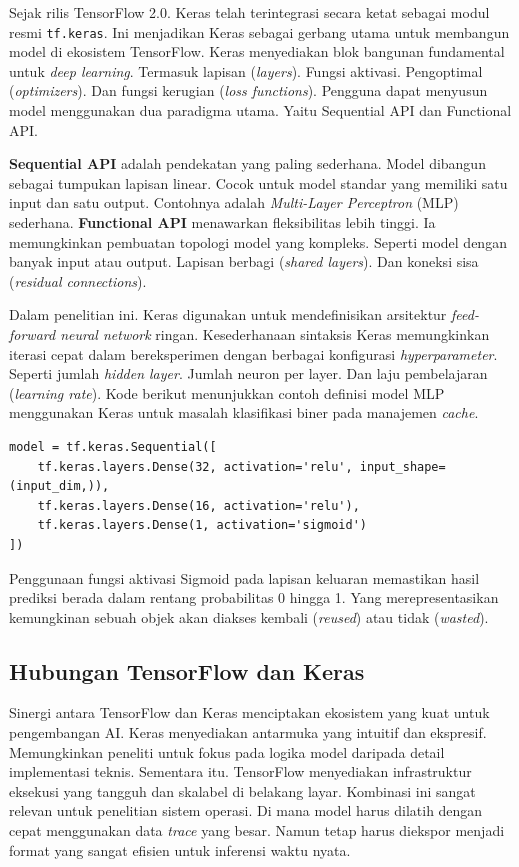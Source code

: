 Sejak rilis TensorFlow 2.0.
Keras telah terintegrasi secara ketat sebagai modul resmi \texttt{tf.keras}.
Ini menjadikan Keras sebagai gerbang utama untuk membangun model di
ekosistem TensorFlow.
Keras menyediakan blok bangunan fundamental untuk \textit{deep learning}.
Termasuk lapisan (\textit{layers}).
Fungsi aktivasi.
Pengoptimal (\textit{optimizers}).
Dan fungsi kerugian (\textit{loss functions}).
Pengguna dapat menyusun model menggunakan dua paradigma utama.
Yaitu Sequential API dan Functional API.

\textbf{Sequential API} adalah pendekatan yang paling sederhana.
Model dibangun sebagai tumpukan lapisan linear.
Cocok untuk model standar yang memiliki satu input dan satu output.
Contohnya adalah \textit{Multi-Layer Perceptron} (MLP) sederhana.
\textbf{Functional API} menawarkan fleksibilitas lebih tinggi.
Ia memungkinkan pembuatan topologi model yang kompleks.
Seperti model dengan banyak input atau output.
Lapisan berbagi (\textit{shared layers}).
Dan koneksi sisa (\textit{residual connections}).

Dalam penelitian ini.
Keras digunakan untuk mendefinisikan arsitektur \textit{feed-forward
neural network} ringan.
Kesederhanaan sintaksis Keras memungkinkan iterasi cepat dalam
bereksperimen dengan berbagai konfigurasi \textit{hyperparameter}.
Seperti jumlah \textit{hidden layer}.
Jumlah neuron per layer.
Dan laju pembelajaran (\textit{learning rate}).
Kode berikut menunjukkan contoh definisi model MLP menggunakan Keras
untuk masalah klasifikasi biner pada manajemen \textit{cache}.

\begin{verbatim}
model = tf.keras.Sequential([
    tf.keras.layers.Dense(32, activation='relu', input_shape=(input_dim,)),
    tf.keras.layers.Dense(16, activation='relu'),
    tf.keras.layers.Dense(1, activation='sigmoid')
])
\end{verbatim}

Penggunaan fungsi aktivasi Sigmoid pada lapisan keluaran memastikan
hasil prediksi berada dalam rentang probabilitas 0 hingga 1.
Yang merepresentasikan kemungkinan sebuah objek akan diakses kembali
(\textit{reused}) atau tidak (\textit{wasted}).

\subsection{Hubungan TensorFlow dan Keras}
Sinergi antara TensorFlow dan Keras menciptakan ekosistem yang kuat
untuk pengembangan AI.
Keras menyediakan antarmuka yang intuitif dan ekspresif.
Memungkinkan peneliti untuk fokus pada logika model daripada detail
implementasi teknis.
Sementara itu.
TensorFlow menyediakan infrastruktur eksekusi yang tangguh dan skalabel
di belakang layar.
Kombinasi ini sangat relevan untuk penelitian sistem operasi.
Di mana model harus dilatih dengan cepat menggunakan data
\textit{trace} yang besar.
Namun tetap harus diekspor menjadi format yang sangat efisien untuk
inferensi waktu nyata.

